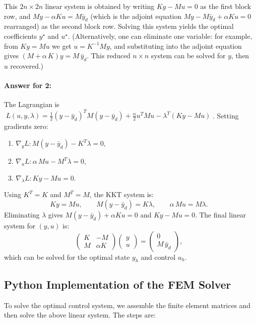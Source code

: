 \documentclass[a4paper,10pt]{article}
\begin{document}
This \(2n\times 2n\) linear system is obtained by writing \(K y - M u = 0\) as the first block row, and \(M y - \alpha K u = M \bar y_d\) (which is the adjoint equation \(M y - M \bar y_d + \alpha K u=0\) rearranged) as the second block row.  Solving this system yields the optimal coefficients \(y^\star\) and \(u^\star\).  (Alternatively, one can eliminate one variable: for example, from \(K y=M u\) we get \(u = K^{-1} M y\), and substituting into the adjoint equation gives \((M + \alpha\,K) y = M\,\bar y_d\). This reduced \(n\times n\) system can be solved for \(y\), then \(u\) recovered.)

\paragraph{Answer for 2:}
The Lagrangian is \(\;L(u,y,\lambda) = \frac{1}{2}(y-\bar y_d)^T M (y-\bar y_d) + \frac{\alpha}{2} u^T M u - \lambda^T(Ky - M u)\;\).
Setting gradients zero:
\begin{enumerate}
	\item \(\nabla_y L: M(y-\bar y_d) - K^T\lambda = 0\),
	\item \(\nabla_u L: \alpha\,M u - M^T\lambda = 0\),
	\item \(\nabla_\lambda L: K y - M u = 0\).
\end{enumerate}


Using \(K^T=K\) and \(M^T=M\), the KKT system is:
\[ K y = M u, \qquad M(y-\bar y_d) = K\lambda, \qquad \alpha\,M u = M\lambda. \]
Eliminating \(\lambda\) gives \(M(y-\bar y_d) + \alpha K u = 0\) and \(K y - M u = 0\). The final linear system for \((y,u)\) is:
\[ \begin{pmatrix}K & -M\\ M & \alpha K\end{pmatrix}\begin{pmatrix}y\\ u\end{pmatrix} = \begin{pmatrix}0\\ M\,\bar y_d\end{pmatrix}, \]
which can be solved for the optimal state \(y_h\) and control \(u_h\).

\subsection{Python Implementation of the FEM Solver}
To solve the optimal control system, we assemble the finite element matrices and then solve the above linear system. The steps are:
\end{document}
